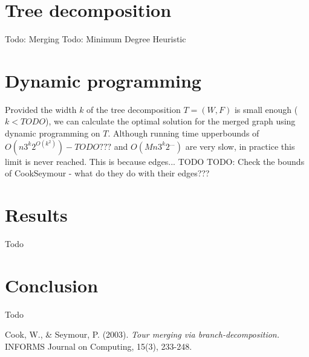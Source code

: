 \documentclass[12pt]{article}
\begin{document}
%
%
\section{Tree decomposition}
\label{sec:td}
Todo: Merging
Todo: Minimum Degree Heuristic



%
%
\section{Dynamic programming}
\label{sec:dp}
Provided the width $k$ of the tree decomposition $T = (W, F)$ is small enough ($k < TODO$), we can
calculate the optimal solution for the merged graph using dynamic programming on $T$. Although
running time upperbounds of $O(n 3^k 2^{O(k^2)}) - TODO???$ and $O(M n 3^k 2^{\dots})$ are very slow, in
practice this limit is never reached. This is because edges... TODO
TODO: Check the bounds of CookSeymour - what do they do with their edges???



%
%
\section{Results}
\label{sec:results}
Todo



%
%
\section{Conclusion}
\label{sec:conclusion}
Todo



%
%
\begin{thebibliography}{9}
        Cook, W., & Seymour, P. (2003).
        \emph{Tour merging via branch-decomposition.}
        INFORMS Journal on Computing, 15(3), 233-248.

\end{thebibliography}
\end{document}
